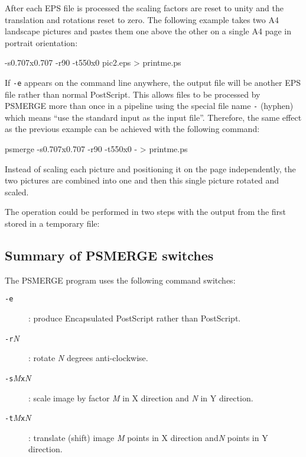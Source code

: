 \documentclass[twoside,11pt,nolof]{starlink}
\begin{document}
After each EPS file is processed the scaling factors are reset to unity
and the translation and rotations reset to zero.  The following example
takes two A4 landscape pictures and pastes them one above the other on
a single A4 page in portrait orientation:

\begin{terminalv}
       -s0.707x0.707 -r90 -t550x0 pic2.eps > printme.ps
\end{terminalv}

If \texttt{-e} appears on the command line anywhere, the output file
will be another EPS file rather than normal PostScript.  This allows
files to be processed by PSMERGE more than once in a pipeline using the
special file name \texttt{-} (hyphen) which means ``use the standard
input as the input file''.  Therefore, the same effect as the previous
example can be achieved with the following command:

\begin{terminalv}
       psmerge -s0.707x0.707 -r90 -t550x0 - > printme.ps
\end{terminalv}

Instead of scaling each picture and positioning it on the page
independently, the two pictures are combined into one and then this
single picture rotated and scaled.

The operation could be performed in two steps with the output from
the first stored in a temporary file:

\begin{terminalv}
\end{terminalv}

\subsection{Summary of PSMERGE switches}
\label{summary_of_switches}

The PSMERGE program uses the following command switches:

\begin{description}

\item[\texttt{-e}]: produce Encapsulated PostScript rather than PostScript.

\item[\texttt{-r}\textit{N}]: rotate \textit{N} degrees anti-clockwise.

\item[\texttt{-s}\textit{M}\texttt{x}\textit{N}]: scale image by factor
\textit{M} in X direction and \textit{N} in Y direction.

\item[\texttt{-t}\textit{M}\texttt{x}\textit{N}]: translate (shift)
image \textit{M} points in X direction and\textit{N} points in Y
direction.

\end{description}

\end{document}
